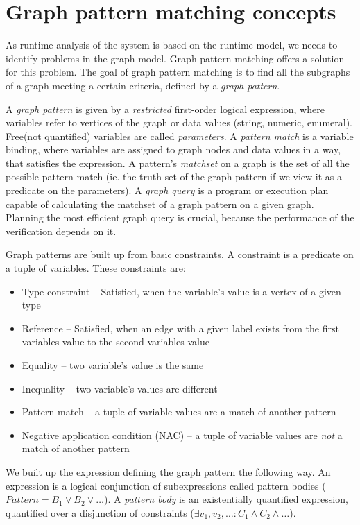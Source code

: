 \section{Graph pattern matching concepts}
\label{section:gpmc}

As runtime analysis of the system is based on the runtime model, we needs to identify problems in the graph model. 
Graph pattern matching offers a solution for this problem. 
The goal of graph pattern matching is to find all the subgraphs of a graph meeting a certain criteria, defined by a \emph{graph pattern}.

A \emph{graph pattern} is given by a \emph{restricted} first-order logical expression, where variables refer to vertices of the graph or data values (string, numeric, enumeral).
Free(not quantified) variables are called \emph{parameters}.  
A \emph{pattern match} is a variable binding, where variables are assigned to graph nodes and data values in a way, that satisfies the expression.
A pattern's \emph{matchset} on a graph is the set of all the possible pattern match (ie. the truth set of the graph pattern if we view it as a predicate on the parameters).
A \emph{graph query} is a program or execution plan capable of calculating the matchset of a graph pattern on a given graph. 
Planning the most efficient graph query is crucial, because the performance of the verification depends on it.

Graph patterns are built up from basic constraints. 
A constraint is a predicate on a tuple of variables. 
These constraints are: 

\begin{itemize}
	\item Type constraint -- Satisfied, when the variable's value is a vertex of a given type
	\item Reference -- Satisfied, when an edge with a given label exists from the first variables value to the second variables value
	\item Equality -- two variable's value is the same
	\item Inequality -- two variable's values are different
	\item Pattern match -- a tuple of variable values are a match of another pattern
	\item Negative application condition (NAC) -- a tuple of variable values are \emph{not} a match of another pattern
\end{itemize}


We built up the expression defining the graph pattern the following way. 
An expression is a logical conjunction of subexpressions called pattern bodies ($Pattern = B_1 \vee B_2 \vee \dots$). 
A \emph{pattern body} is an existentially quantified expression, quantified over a disjunction of constraints ($\exists{} v_1, v_2, \dots : C_1 \wedge{} C_2 \wedge \dots$).

